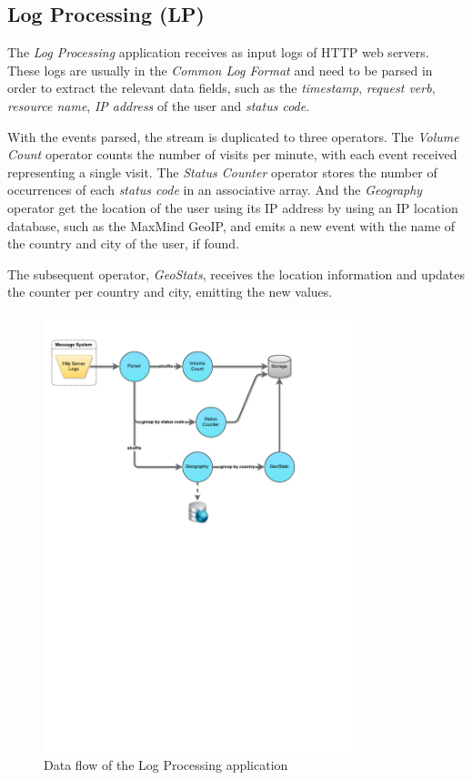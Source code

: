 \documentclass[ppgc,diss,english]{iiufrgs}
\begin{document}
\subsection{Log Processing (LP)}

The \emph{Log Processing} application receives as input logs of HTTP web servers. These logs are usually in the \emph{Common Log Format} and need to be parsed in order to extract the relevant data fields, such as the \emph{timestamp}, \emph{request verb}, \emph{resource name}, \emph{IP address} of the user and \emph{status code}.

With the events parsed, the stream is duplicated to three operators. The \emph{Volume Count} operator counts the number of visits per minute, with each event received representing a single visit. The \emph{Status Counter} operator stores the number of occurrences of each \emph{status code} in an associative array. And the \emph{Geography} operator get the location of the user using its IP address by using an IP location database, such as the MaxMind GeoIP, and emits a new event with the name of the country and city of the user, if found.

The subsequent operator, \emph{GeoStats}, receives the location information and updates the counter per country and city, emitting the new values.

\begin{figure}[!ht]
	\centering
	\includegraphics[width=0.8\textwidth]{images/apps/LogProcessing.pdf}
	\caption{Data flow of the Log Processing application}
	\label{fig:app_log_processing}
\end{figure}
\end{document}

